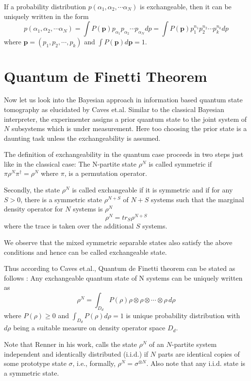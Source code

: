 If a probability distribution $p(\alpha_{1}, \alpha_{2}, \cdots \alpha_{N})$ is exchangeable, then it can be uniquely written in the form
$$
p(\alpha_{1}, \alpha_{2}, \cdots \alpha_{N}) = \int P(\textbf{p}) p_{\alpha_{1}} p_{\alpha_{2}} \cdots p_{\alpha_{N}}  dp = \int P(\textbf{p}) p_{1}^{n_{1}} p_{2}^{n_{2}} \cdots p_{k}^{n_{k}} dp
$$ 
where $\textbf{p} = (p_{1}, p_{2}, \cdots, p_{k} )$ and $\int P(\textbf{p}) d\textbf{p} = 1$.


\section{Quantum de Finetti Theorem}\label{chap16-sec3}

Now let us look into the Bayesian approach in information based quantum state tomography as elucidated by Caves et.al.\cite{chap16-key8} Similar to the classical Bayesian interpreter, the experimenter assigns a prior quantum state to the joint system of $N$ subsystems which is under measurement. Here too choosing the prior state is a daunting task unless the exchangeability is assumed.

The definition of exchangeability in the quantum case proceeds in two steps just like in the classical case:
The N-partite state $\rho^{N}$ is called symmetric if $\pi \rho^{N} \pi^{\dagger} = \rho^{N}$ where $\pi$, is a permutation operator.

Secondly, the state $\rho^{N}$ is called exchangeable if it is symmetric and if for any $S > 0$, there is a symmetric state $\rho^{N+S}$ of $N+S$ systems such that the marginal density operator for $N$ systems is $\rho^{N}$
$$
\rho^{N} = tr_{S} \rho^{N+S}
$$ 
where the trace is taken over the additional $S$ systems.

We observe that the mixed symmetric separable states also satisfy the above conditions and hence can be called exchangeable state.

Thus according to Caves et.al.\cite{chap16-key8}, Quantum de Finetti theorem can be stated as follows :
Any exchangeable quantum state of N systems can be uniquely written as 
$$
\rho^{N} = \int_{D_{d}} P(\rho) \rho \otimes \rho \otimes \cdots \otimes \rho\,d\rho
$$ 
where $P(\rho) \geq 0$ and $\int_{D_{d}} P(\rho) d\rho = 1$ is unique probability distribution with $d\rho$ being a suitable measure on density operator space $D_{d}$.

Note that Renner\cite{chap16-key1} in his work, calls the state $\rho^{N}$ of an $N$-partite system independent and identically distributed (i.i.d.) if $N$ parts are identical copies of some prototype state $\sigma$, i.e., formally, $\rho^{N} = \sigma^{\otimes N}$. Also note that any i.i.d. state is a symmetric state.

